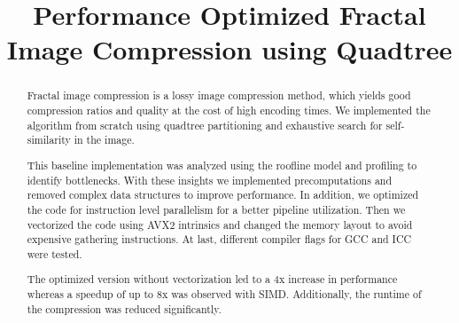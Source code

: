 \documentclass[letterpaper]{article}
\title{Performance Optimized Fractal Image Compression using Quadtree}
\begin{document}
%
\maketitle
%
%

\setlength{\abovedisplayskip}{1ex}
\setlength{\belowdisplayskip}{1ex}

\begin{abstract}
  Fractal image compression is a lossy image compression method, which yields
  good compression ratios and quality at the cost of high encoding times. We
  implemented the algorithm from scratch using quadtree partitioning and
  exhaustive search for self-similarity in the image.

  This baseline implementation was analyzed using the roofline model and
  profiling to identify bottlenecks. With these insights we implemented
  precomputations and removed complex data structures to improve performance. In
  addition, we optimized the code for instruction level parallelism
  for a better pipeline utilization. Then we vectorized the code
  using AVX2 intrinsics and changed the memory layout to avoid expensive
  gathering instructions. At last, different compiler flags for GCC and ICC were
  tested.

  The optimized version without vectorization led to a 4x increase in
  performance whereas a speedup of up to 8x was observed with SIMD.
  Additionally, the runtime of the compression was reduced significantly.

\end{abstract}










\end{document}
